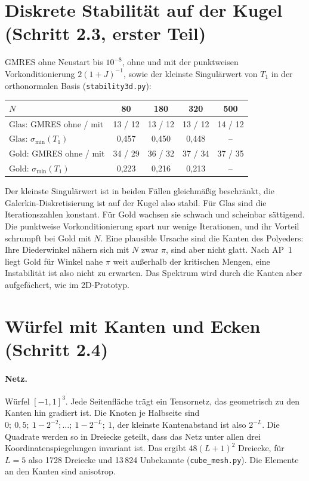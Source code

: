 \documentclass[11pt, a4paper]{article}
\begin{document}
\section{Diskrete Stabilität auf der Kugel (Schritt 2.3, erster Teil)}
GMRES ohne Neustart bis $10^{-8}$, ohne und mit der punktweisen Vorkonditionierung
$2(1+J)^{-1}$, sowie der kleinste Singulärwert von $T_1$ in der orthonormalen Basis
(\texttt{stability3d.py}):
\begin{center}\small
\begin{tabular}{lcccc}
\toprule
$N$ & 80 & 180 & 320 & 500\\
\midrule
Glas: GMRES ohne / mit & 13 / 12 & 13 / 12 & 13 / 12 & 14 / 12\\
Glas: $\sigma_{\min}(T_1)$ & 0,457 & 0,450 & 0,448 & --\\
Gold: GMRES ohne / mit & 34 / 29 & 36 / 32 & 37 / 34 & 37 / 35\\
Gold: $\sigma_{\min}(T_1)$ & 0,223 & 0,216 & 0,213 & --\\
\bottomrule
\end{tabular}
\end{center}
Der kleinste Singulärwert ist in beiden Fällen gleichmäßig beschränkt, die
Galerkin-Diskretisierung ist auf der Kugel also stabil. Für Glas sind die
Iterationszahlen konstant. Für Gold wachsen sie schwach und scheinbar
sättigend. Die punktweise Vorkonditionierung spart nur wenige Iterationen, und ihr
Vorteil schrumpft bei Gold mit $N$. Eine plausible Ursache sind die Kanten des Polyeders:
Ihre Diederwinkel nähern sich mit $N$ zwar $\pi$, sind aber nicht glatt. Nach AP~1
liegt Gold für Winkel nahe $\pi$ weit außerhalb der kritischen Mengen, eine
Instabilität ist also nicht zu erwarten. Das Spektrum wird durch die Kanten aber
aufgefächert, wie im 2D-Prototyp.

\section{Würfel mit Kanten und Ecken (Schritt 2.4)}\label{sec:wuerfel}

\paragraph{Netz.} Würfel $[-1,1]^3$. Jede Seitenfläche trägt ein Tensornetz, das
geometrisch zu den Kanten hin gradiert ist. Die Knoten je Halbseite sind
$0;\ 0{,}5;\ 1-2^{-2};\dots;\ 1-2^{-L};\ 1$, der kleinste Kantenabstand ist also $2^{-L}$.
Die Quadrate werden so in Dreiecke geteilt, dass das Netz unter allen drei
Koordinatenspiegelungen invariant ist. Das ergibt $48(L+1)^2$ Dreiecke, für $L=5$ also
1728 Dreiecke und 13\,824 Unbekannte (\texttt{cube\_mesh.py}). Die Elemente an den Kanten
sind anisotrop.
\end{document}
